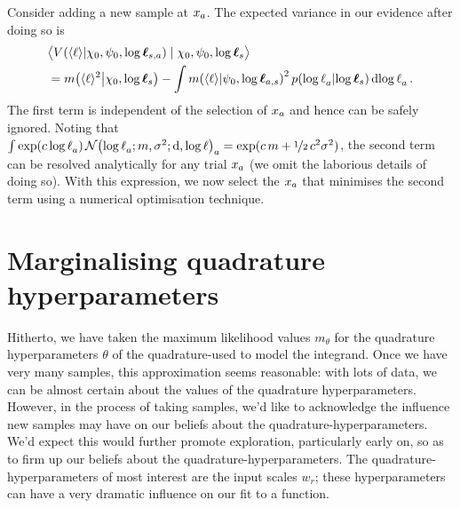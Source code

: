 \documentclass{article}
\begin{document}
Consider adding a new sample at $\lfv_a$. The expected variance in our evidence after doing so is
\begin{align}
& \bigl\langle \cov{\inty{\lfn}}{\chi_0,\psi_0,\tvr_{s,a}}\mid \chi_0,\psi_0,\tvr_{s}\bigr\rangle\nonumber\\
& = \mean{\inty{\lfn}^2}{\chi_0,\tvr_s}  - 
\int\mean{\inty{\lfn}}{\psi_0,\tvr_{a,s}}^2\p{\tr_a}{\tvr_s}\ud\tr_a\,.\label{eqn:exp_var}
\end{align}
The first term is independent of the selection of $\lfv_a$ and hence can be safely ignored. Noting that $\int \exp(c\, \tr_a)\, \N{\tr_a;m, \sigma^2} \ud\tr_a = \exp(c\, m + \nicefrac{1}{2}\, c^2 \sigma^2)$, the second term can be resolved analytically for any trial $\lfv_a$ (we omit the laborious details of doing so). With this expression, we now select the $\lfv_a$ that minimises the second term using a numerical optimisation technique. 

\section{Marginalising quadrature hyperparameters}

Hitherto, we have taken the maximum likelihood values $m_\theta$ for the quadrature hyperparameters $\theta$ of the quadrature-\gpb used to model the integrand. Once we have very many samples, this approximation seems reasonable: with lots of data, we can be almost certain about the values of the quadrature hyperparameters. However, in the process of taking samples, we'd like to acknowledge the influence new samples may have on our beliefs about the quadrature-hyperparameters. We'd expect this would further promote exploration, particularly early on, so as to firm up our beliefs about the quadrature-hyperparameters. The quadrature-hyperparameters of most interest are the input scales $w_r$; these hyperparameters can have a very dramatic influence on our fit to a function.
\end{document}

